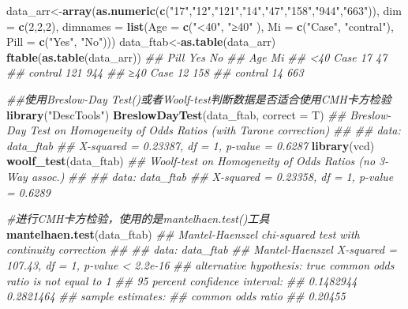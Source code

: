 \documentclass[
]{article}
\newenvironment{Shaded}{\begin{snugshade}}{\end{snugshade}}
\newcommand{\CommentTok}[1]{\textcolor[rgb]{0.56,0.35,0.01}{\textit{#1}}}
\newcommand{\DataTypeTok}[1]{\textcolor[rgb]{0.13,0.29,0.53}{#1}}
\newcommand{\DecValTok}[1]{\textcolor[rgb]{0.00,0.00,0.81}{#1}}
\newcommand{\KeywordTok}[1]{\textcolor[rgb]{0.13,0.29,0.53}{\textbf{#1}}}
\newcommand{\NormalTok}[1]{#1}
\newcommand{\StringTok}[1]{\textcolor[rgb]{0.31,0.60,0.02}{#1}}
\begin{document}
\begin{Shaded}
\begin{Highlighting}[]

\NormalTok{data_arr<-}\KeywordTok{array}\NormalTok{(}\KeywordTok{as.numeric}\NormalTok{(}\KeywordTok{c}\NormalTok{(}\StringTok{"17"}\NormalTok{,}\StringTok{"12"}\NormalTok{,}\StringTok{"121"}\NormalTok{,}\StringTok{"14"}\NormalTok{,}\StringTok{"47"}\NormalTok{,}\StringTok{"158"}\NormalTok{,}\StringTok{"944"}\NormalTok{,}\StringTok{"663"}\NormalTok{)),}
                   \DataTypeTok{dim =} \KeywordTok{c}\NormalTok{(}\DecValTok{2}\NormalTok{,}\DecValTok{2}\NormalTok{,}\DecValTok{2}\NormalTok{),}
                   \DataTypeTok{dimnames =}
                   \KeywordTok{list}\NormalTok{(}\DataTypeTok{Age =} \KeywordTok{c}\NormalTok{(}\StringTok{"<40"}\NormalTok{, }\StringTok{"≥40"}\NormalTok{ ),}
                        \DataTypeTok{Mi =} \KeywordTok{c}\NormalTok{(}\StringTok{"Case"}\NormalTok{, }\StringTok{"contral"}\NormalTok{),}
                        \DataTypeTok{Pill =} \KeywordTok{c}\NormalTok{(}\StringTok{"Yes"}\NormalTok{, }\StringTok{"No"}\NormalTok{)))}
\NormalTok{data_ftab<-}\KeywordTok{as.table}\NormalTok{(data_arr)}
\KeywordTok{ftable}\NormalTok{(}\KeywordTok{as.table}\NormalTok{(data_arr))}
\CommentTok{##              Pill Yes  No}
\CommentTok{##  Age Mi                  }
\CommentTok{##  <40 Case          17  47}
\CommentTok{##      contral      121 944}
\CommentTok{##  ≥40 Case          12 158}
\CommentTok{##      contral       14 663}

\CommentTok{##使用Breslow-Day Test()或者Woolf-test判断数据是否适合使用CMH卡方检验}
\KeywordTok{library}\NormalTok{(}\StringTok{"DescTools"}\NormalTok{)}
\KeywordTok{BreslowDayTest}\NormalTok{(data_ftab, }\DataTypeTok{correct =}\NormalTok{ T)}
\CommentTok{##      Breslow-Day Test on Homogeneity of Odds Ratios (with Tarone correction)}
\CommentTok{##  }
\CommentTok{##  data:  data_ftab}
\CommentTok{##  X-squared = 0.23387, df = 1, p-value = 0.6287}
\KeywordTok{library}\NormalTok{(vcd)}
\KeywordTok{woolf_test}\NormalTok{(data_ftab)}
\CommentTok{##      Woolf-test on Homogeneity of Odds Ratios (no 3-Way assoc.)}
\CommentTok{##  }
\CommentTok{##  data:  data_ftab}
\CommentTok{##  X-squared = 0.23358, df = 1, p-value = 0.6289}

\CommentTok{#进行CMH卡方检验，使用的是mantelhaen.test()工具}
\KeywordTok{mantelhaen.test}\NormalTok{(data_ftab)}
\CommentTok{##      Mantel-Haenszel chi-squared test with continuity correction}
\CommentTok{##  }
\CommentTok{##  data:  data_ftab}
\CommentTok{##  Mantel-Haenszel X-squared = 107.43, df = 1, p-value < 2.2e-16}
\CommentTok{##  alternative hypothesis: true common odds ratio is not equal to 1}
\CommentTok{##  95 percent confidence interval:}
\CommentTok{##   0.1482944 0.2821464}
\CommentTok{##  sample estimates:}
\CommentTok{##  common odds ratio }
\CommentTok{##            0.20455 }
\end{Highlighting}
\end{Shaded}
\end{document}

